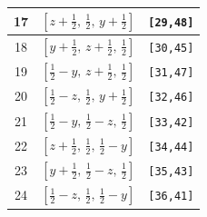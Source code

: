 \documentclass[fleqn,8pt]{jsarticle}
\begin{document}
\begin{longtable}{ccc}
17 & $\left[ z + \frac{1}{2},\, \frac{1}{2},\, y + \frac{1}{2} \right]$ & {\tt [29,48]} \\ \hline
18 & $\left[ y + \frac{1}{2},\, z + \frac{1}{2},\, \frac{1}{2} \right]$ & {\tt [30,45]} \\ \hline
19 & $\left[ \frac{1}{2} - y,\, z + \frac{1}{2},\, \frac{1}{2} \right]$ & {\tt [31,47]} \\ \hline
20 & $\left[ \frac{1}{2} - z,\, \frac{1}{2},\, y + \frac{1}{2} \right]$ & {\tt [32,46]} \\ \hline
21 & $\left[ \frac{1}{2} - y,\, \frac{1}{2} - z,\, \frac{1}{2} \right]$ & {\tt [33,42]} \\ \hline
22 & $\left[ z + \frac{1}{2},\, \frac{1}{2},\, \frac{1}{2} - y \right]$ & {\tt [34,44]} \\ \hline
23 & $\left[ y + \frac{1}{2},\, \frac{1}{2} - z,\, \frac{1}{2} \right]$ & {\tt [35,43]} \\ \hline
24 & $\left[ \frac{1}{2} - z,\, \frac{1}{2},\, \frac{1}{2} - y \right]$ & {\tt [36,41]} \\
\end{longtable}
\renewcommand{\arraystretch}{1.2}
\end{document}
